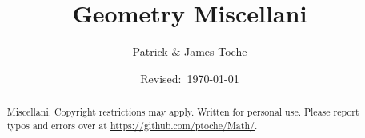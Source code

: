 \documentclass[12pt]{article}
\title{Geometry Miscellani}
\author{Patrick \& James Toche}
\date{Revised:~\today}
\begin{document}
\maketitle
\begin{minipage}{\textwidth}
\begin{abstract}\setlength{\parindent}{0pt}%
Miscellani.
Copyright restrictions may apply. Written for personal use. 
Please report typos and errors over at \url{https://github.com/ptoche/Math/}. 
\end{abstract}
\end{minipage}

\thispagestyle{empty}
\clearpage

\section[Geometry]{}\nopagebreak

\end{document}
